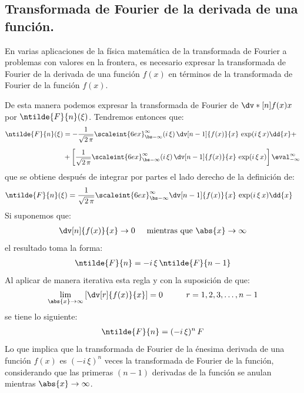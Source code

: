 \subsection{Transformada de Fourier de la derivada de una función.}

En varias aplicaciones de la física matemática de la transformada de Fourier a problemas con valores en la frontera, es necesario expresar la transformada de Fourier de la derivada de una función $f(x)$ en términos de la transformada de Fourier de la función $f(x)$.
\par
De esta manera podemos expresar la transformada de Fourier de \hfill \break
$\dv*[n]{f(x)}{x}$ por $\ntilde{F}{n} (\xi)$. Tendremos entonces que:
\begin{align*}
\ntilde{F}{n}(\xi) &= -\dfrac{1}{\sqrt{2 \, \pi}} \scaleint{6ex}_{\bs -\infty}^{\infty} (i \, \xi) \, \dv[n-1]{f(x)}{x} \, \exp(i \, \xi \, x) \dd{x} + \\[0.5em]
&+ \left[ \dfrac{1}{\sqrt{2 \, \pi}} \scaleint{6ex}_{\bs -\infty}^{\infty} (i \, \xi) \, \dv[n-1]{f(x)}{x} \, \exp(i \, \xi \, x) \right] \eval_{-\infty}^{\infty}
\end{align*}
que se obtiene después de integrar por partes el lado derecho de la definición de:
\begin{align}
\ntilde{F}{n}(\xi) &= \dfrac{1}{\sqrt{2 \, \pi}} \scaleint{6ex}_{\bs -\infty}^{\infty} \dv[n-1]{f(x)}{x} \, \exp(i \, \xi \, x) \dd{x}
\label{eq:ecuacion_01_36}
\end{align}
Si suponemos que:
\begin{align*}
\dv[n]{f(x)}{x} \to 0 \hspace{0.5cm} \mbox{mientras que  } \abs{x} \to \infty
\end{align*}
el resultado toma la forma:
\begin{align*}
\ntilde{F}{n} = - i \, \xi \, \ntilde{F}{n-1}
\end{align*}
Al aplicar de manera iterativa esta regla y con la suposición de que:
\begin{align*}
\lim_{\abs{x} \to \infty} \left[ \dv[r]{f(x)}{x} \right] = 0 \hspace{1cm} r = 1, 2, 3, \ldots, n-1
\end{align*}
se tiene lo siguiente:
\begin{align*}
\ntilde{F}{n} = (- i \, \xi)^{n} \, F
\end{align*}
Lo que implica que la transformada de Fourier de la énesima derivada de una función $f(x)$ es $(- i \, \xi)^{n}$ veces la transformada de Fourier de la función, considerando que las primeras $(n - 1)$ derivadas de la función se anulan mientras $\abs{x} \to \infty$.
